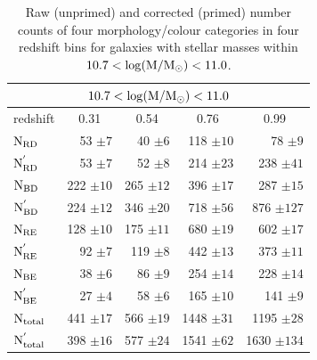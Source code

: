 \documentclass[useAMS,usenatbib]{mn2e}
\begin{document}
\begin{table}
\begin{tabular}{lrrrr}
\hline
\hline
\multicolumn{5}{c}{$10.7<\rm \log(M/M_{\odot})<11.0$}\\
\hline
\hline
\multicolumn{1}{l}{redshift} & \multicolumn{1}{c}{0.31} & \multicolumn{1}{c}{0.54} & \multicolumn{1}{c}{0.76} & \multicolumn{1}{c}{0.99} \\
\hline
$\rm N_{RD}$        & 53 $\pm 7$      & 40 $\pm 6$      & 118 $\pm 10$     & 78 $\pm 9$     \\
$\rm N^{'}_{RD}$    & 53 $\pm 7$      & 52 $\pm 8$      & 214 $\pm 23$     & 238 $\pm 41$    \\
$\rm N_{BD}$        & 222 $\pm 10$    & 265 $\pm 12$    & 396 $\pm 17$     & 287 $\pm 15$   \\
$\rm N^{'}_{BD}$    & 224 $\pm 12$    & 346 $\pm 20$    & 718 $\pm 56$     & 876 $\pm 127$ \\
$\rm N_{RE}$        & 128 $\pm 10$    & 175 $\pm 11$    & 680 $\pm 19$     & 602 $\pm 17$   \\
$\rm N^{'}_{RE}$    & 92 $\pm 7$      & 119 $\pm 8$     & 442 $\pm 13$     & 373 $\pm 11$    \\
$\rm N_{BE}$        & 38 $\pm 6$      & 86 $\pm 9$      & 254 $\pm 14$     & 228 $\pm 14$   \\
$\rm N^{'}_{BE}$    & 27 $\pm 4$      & 58 $\pm 6$      & 165 $\pm 10$     & 141 $\pm 9$    \\
\hline
$\rm N_{total}$     & 441 $\pm 17$    & 566 $\pm 19$   & 1448 $\pm 31$  & 1195 $\pm 28$   \\
$\rm N^{'}_{total}$ & 398 $\pm 16$    & 577 $\pm 24$   & 1541 $\pm 62$  & 1630 $\pm 134$   \\
\hline
\hline
\end{tabular}
\caption{Raw (unprimed) and corrected (primed) number counts of four morphology/colour categories in four redshift bins for galaxies with stellar masses within $\rm 10.7< \log(M/M_{\odot})<11.0$. }
\label{tab:counts_table}
\end{table}
\end{document}
